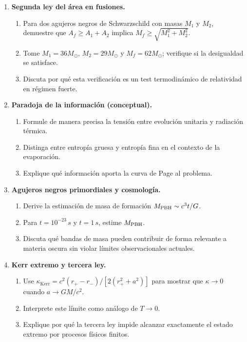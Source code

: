 \begin{enumerate}[leftmargin=2em, label=\textbf{P\thechapter.\arabic*.}]
  \item \textbf{Segunda ley del área en fusiones.}
  \begin{enumerate}[label=(\alph*)]
    \item Para dos agujeros negros de Schwarzschild con masas $M_1$ y $M_2$, demuestre que $A_f\ge A_1+A_2$ implica $M_f\ge\sqrt{M_1^2+M_2^2}$.
    \item Tome $M_1=36M_\odot$, $M_2=29M_\odot$ y $M_f=62M_\odot$; verifique si la desigualdad se satisface.
    \item Discuta por qué esta verificación es un test termodinámico de relatividad en régimen fuerte.
  \end{enumerate}

  \item \textbf{Paradoja de la información (conceptual).}
  \begin{enumerate}[label=(\alph*)]
    \item Formule de manera precisa la tensión entre evolución unitaria y radiación térmica.
    \item Distinga entre entropía gruesa y entropía fina en el contexto de la evaporación.
    \item Explique qué información aporta la curva de Page al problema.
  \end{enumerate}

  \item \textbf{Agujeros negros primordiales y cosmología.}
  \begin{enumerate}[label=(\alph*)]
    \item Derive la estimación de masa de formación $M_{\rm PBH}\sim c^3t/G$.
    \item Para $t=10^{-23}\,\si{s}$ y $t=1\,\si{s}$, estime $M_{\rm PBH}$.
    \item Discuta qué bandas de masa pueden contribuir de forma relevante a materia oscura sin violar límites observacionales actuales.
  \end{enumerate}

  \item \textbf{Kerr extremo y tercera ley.}
  \begin{enumerate}[label=(\alph*)]
    \item Use $\kappa_{\text{Kerr}}=c^2(r_+-r_-)/[2(r_+^2+a^2)]$ para mostrar que $\kappa\to0$ cuando $a\to GM/c^2$.
    \item Interprete este límite como análogo de $T\to0$.
    \item Explique por qué la tercera ley impide alcanzar exactamente el estado extremo por procesos físicos finitos.
  \end{enumerate}


\end{enumerate}
